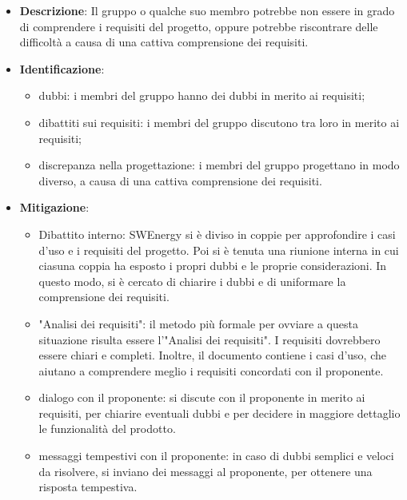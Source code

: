 \label{risk:comprensione dei requisiti carente}
\begin{itemize}
	\item \textbf{Descrizione}:
	      Il gruppo o qualche suo membro potrebbe non essere in grado di
	      comprendere i requisiti del progetto, oppure potrebbe riscontrare
	      delle difficoltà a causa di una cattiva comprensione dei requisiti.
	\item \textbf{Identificazione}:
	      \begin{itemize}
		      \item dubbi: i membri del gruppo hanno dei dubbi in merito ai
		            requisiti;

		      \item dibattiti sui requisiti: i membri del gruppo
		            discutono tra loro in merito ai requisiti;

		      \item discrepanza nella progettazione: i membri del gruppo
		            progettano in modo diverso, a causa di una cattiva
		            comprensione dei requisiti.
	      \end{itemize}
	\item \textbf{Mitigazione}:
	      \begin{itemize}
		      \item Dibattito interno: SWEnergy si è diviso in coppie per
		            approfondire i casi d'uso e i requisiti del progetto. Poi si
		            è tenuta una riunione interna in cui ciasuna coppia ha
		            esposto i propri dubbi e le proprie considerazioni. In
		            questo modo, si è cercato di chiarire i dubbi e di
		            uniformare la comprensione dei requisiti.

		      \item "Analisi dei requisiti": il metodo più formale per ovviare a
		            questa situazione risulta essere l'"Analisi dei requisiti".
		            I requisiti dovrebbero essere chiari e completi. Inoltre,
		            il documento contiene i casi d'uso, che aiutano a
		            comprendere meglio i requisiti concordati con il proponente.

		      \item dialogo con il proponente: si discute con il proponente in
		            merito ai requisiti, per chiarire eventuali dubbi e per
		            decidere in maggiore dettaglio le funzionalità del prodotto.

		      \item messaggi tempestivi con il proponente: in caso di dubbi
		            semplici e veloci da risolvere, si inviano dei messaggi al
		            proponente, per ottenere una risposta tempestiva.
	      \end{itemize}
\end{itemize}
